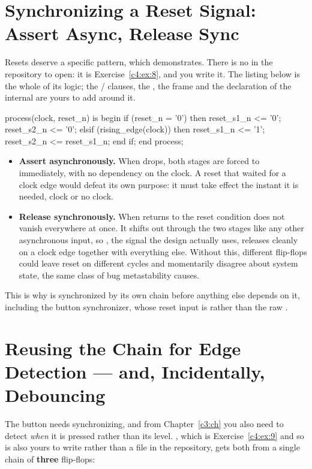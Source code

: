 \section{Synchronizing a Reset Signal: Assert Async, Release Sync}
\label{c4:a5}
Resets deserve a specific pattern, which  demonstrates. There is no
 in the repository to open: it is Exercise~\ref{c4:ex:8}, and you write it.
The listing below is the whole of its logic; the / clauses, the
, the  frame and the declaration of the internal 
are yours to add around it.

\begin{vhdlcode}
process(clock, reset_n) is
begin
    if (reset_n = '0') then
        reset_s1_n <= '0';
        reset_s2_n <= '0';
    elsif (rising_edge(clock)) then
        reset_s1_n <= '1';
        reset_s2_n <= reset_s1_n;
    end if;
end process;
\end{vhdlcode}

\begin{itemize}
  \item \textbf{Assert asynchronously.} When  drops, both stages are forced to
     immediately, with no dependency on the clock. A reset that waited for a clock edge
    would defeat its own purpose: it must take effect the instant it is needed, clock or no clock.
  \item \textbf{Release synchronously.} When  returns to  the reset condition
    does not vanish everywhere at once. It shifts out through the two stages like any other
    asynchronous input, so , the signal the design actually uses, releases cleanly
    on a clock edge together with everything else. Without this, different flip-flops could leave
    reset on different cycles and momentarily disagree about system state, the same class of bug
    metastability causes.
\end{itemize}
This is why  is synchronized by its own chain before anything else depends on it,
including the button synchronizer, whose reset input is  rather than the raw
.

\section{Reusing the Chain for Edge Detection --- and, Incidentally, Debouncing}
\label{c4:a6}
The button needs synchronizing, and from Chapter~\ref{c3:ch} you also need to detect \emph{when} it
is pressed rather than its level. , which is Exercise~\ref{c4:ex:9} and so is also
yours to write rather than a file in the repository, gets both from a single chain of
\textbf{three} flip-flops:

